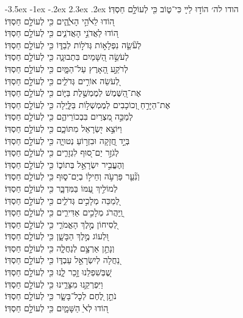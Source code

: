 \documentclass[12pt,letterpaper]{siddur}
\makeatletter
\renewcommand\section{\setcounter{mishnah}{0}\@startsection {section}{1}{\z@}%
                                   {-3.5ex \@plus -1ex \@minus -.2ex}%
                                   {2.3ex \@plus.2ex}%
                                   {\normalfont\large}}
\makeatother
\begin{document}
\begin{multicols}{2}
\section{הודו לה׳}
הוֹד֣וּ לַײָ כִּי־ט֑וֹב\hfill
כִּ֖י לְעוֹלָ֣ם חַסְדּֽוֹ׃\\
ה֭וֹדוּ לֵﭏֺהֵ֣י הָﭏֱֺהִ֑ים\hfill
כִּ֖י לְעוֹלָ֣ם חַסְדּֽוֹ׃\\
ה֭וֹדוּ לַאֲדֹנֵ֣י הָאֲדֹנִ֑ים\hfill
כִּ֖י לְעוֹלָ֣ם חַסְדּֽוֹ׃\\
לְעֹ֘שֵׂ֤ה נִפְלָא֣וֹת גְּדֹל֣וֹת לְבַדּ֑וֹ\hfill
כִּ֖י לְעוֹלָ֣ם חַסְדּֽוֹ׃\\
לְעֹשֵׂ֣ה הַ֭שָּׁמַיִם בִּתְבוּנָ֑ה\hfill
כִּ֖י לְעוֹלָ֣ם חַסְדּֽוֹ׃\\
לְרֹקַ֣ע הָ֭אָרֶץ עַל־הַמָּ֑יִם\hfill
כִּ֖י לְעוֹלָ֣ם חַסְדּֽוֹ׃\\
לְ֭עֹשֵׂה אוֹרִ֣ים גְּדֹלִ֑ים\hfill
כִּ֖י לְעוֹלָ֣ם חַסְדּֽוֹ׃\\
אֶת־הַ֭שֶּׁמֶשׁ לְמֶמְשֶׁ֣לֶת בַּיּ֑וֹם\hfill
כִּ֖י לְעוֹלָ֣ם חַסְדּֽוֹ׃\\
אֶת־הַיָּרֵ֣חַ וְ֭כוֹכָבִים לְמֶמְשְׁל֣וֹת בַּלָּ֑יְלָה\hfill
כִּ֖י לְעוֹלָ֣ם חַסְדּֽוֹ׃\\
לְמַכֵּ֣ה מִ֭צְרַיִם בִּבְכוֹרֵיהֶ֑ם\hfill
כִּ֖י לְעוֹלָ֣ם חַסְדּֽוֹ׃\\
וַיּוֹצֵ֣א יִ֭שְׂרָאֵל מִתּוֹכָ֑ם\hfill
כִּ֖י לְעוֹלָ֣ם חַסְדּֽוֹ׃\\
בְּיָ֣ד חֲ֭זָקָה וּבִזְר֣וֹעַ נְטוּיָ֑ה\hfill
כִּ֖י לְעוֹלָ֣ם חַסְדּֽוֹ׃\\
לְגֹזֵ֣ר יַם־ס֭וּף לִגְזָרִ֑ים\hfill
כִּ֖י לְעוֹלָ֣ם חַסְדּֽוֹ׃\\
וְהֶעֱבִ֣יר יִשְׂרָאֵ֣ל בְּתוֹכ֑וֹ\hfill
כִּ֖י לְעוֹלָ֣ם חַסְדּֽוֹ׃\\
וְנִ֘עֵ֤ר פַּרְעֹ֣ה וְחֵיל֣וֹ בְיַם־ס֑וּף\hfill
כִּ֖י לְעוֹלָ֣ם חַסְדּֽוֹ׃\\
לְמוֹלִ֣יךְ עַ֭מּוֹ בַּמִּדְבָּ֑ר\hfill
כִּ֖י לְעוֹלָ֣ם חַסְדּֽוֹ׃\\
לְ֭מַכֵּה מְלָכִ֣ים גְּדֹלִ֑ים\hfill
כִּ֖י לְעוֹלָ֣ם חַסְדּֽוֹ׃\\
וַֽ֭יַּהֲרֹג מְלָכִ֣ים אַדִּירִ֑ים\hfill
כִּ֖י לְעוֹלָ֣ם חַסְדּֽוֹ׃\\
לְ֭סִיחוֹן מֶ֣לֶךְ הָאֱמֹרִ֑י\hfill
כִּ֖י לְעוֹלָ֣ם חַסְדּֽוֹ׃\\
וּ֭לְעוֹג מֶ֣לֶךְ הַבָּשָׁ֑ן\hfill
כִּ֖י לְעוֹלָ֣ם חַסְדּֽוֹ׃\\
וְנָתַ֣ן אַרְצָ֣ם לְנַחֲלָ֑ה\hfill
כִּ֖י לְעוֹלָ֣ם חַסְדּֽוֹ׃\\
נַ֭חֲלָה לְיִשְׂרָאֵ֣ל עַבְדּ֑וֹ\hfill
כִּ֖י לְעוֹלָ֣ם חַסְדּֽוֹ׃\\
שֶׁ֭בְּשִׁפְלֵנוּ זָ֣כַר לָ֑נוּ\hfill
כִּ֖י לְעוֹלָ֣ם חַסְדּֽוֹ׃\\
וַיִּפְרְקֵ֥נוּ מִצָּרֵ֑ינוּ\hfill
כִּ֖י לְעוֹלָ֣ם חַסְדּֽוֹ׃\\
נֹתֵ֣ן לֶ֭חֶם לְכׇל־בָּשָׂ֑ר\hfill
כִּ֖י לְעוֹלָ֣ם חַסְדּֽוֹ׃\\
ה֭וֹדוּ לְﭏֵ הַשָּׁמָ֑יִם\hfill
כִּ֖י לְעוֹלָ֣ם חַסְדּֽוֹ׃\\

\end{multicols}
\end{document}
